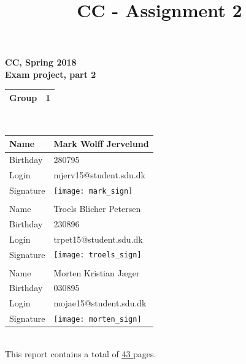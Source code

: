 \documentclass[a4paper,10pt,titlepage]{report}
\date{}
\title{CC - Assignment 2}
\begin{document}
\newpage
{%
\centering
    \huge
    \bfseries
    \vspace{5mm}
CC, Spring 2018\\
Exam project, part 2\\
\vspace{5mm}
\begin{tabular}{|l|l|}
\hline
Group & 1 \\ \hline
\end{tabular}
\\
\vspace{10mm}
\begin{tabular}{@{}ll@{}}
\toprule
\multicolumn{1}{|l|}{Name}      & \multicolumn{1}{l|}{Mark Wolff Jervelund } \\ \midrule
\multicolumn{1}{|l|}{Birthday}  & \multicolumn{1}{l|}{280795} \\ \midrule
\multicolumn{1}{|l|}{Login}     & \multicolumn{1}{l|}{mjerv15@student.sdu.dk} \\ \midrule
\multicolumn{1}{|l|}{Signature} & \multicolumn{1}{l|}{\texttt{[image: mark\_sign]}} \\ \midrule
                                &                       \\ \midrule
\multicolumn{1}{|l|}{Name}      &  \multicolumn{1}{l|}{Troels Blicher Petersen} \\ \midrule
\multicolumn{1}{|l|}{Birthday}      &   \multicolumn{1}{l|}{230896} \\ \midrule
\multicolumn{1}{|l|}{Login}      &  \multicolumn{1}{l|}{trpet15@student.sdu.dk} \\ \midrule
\multicolumn{1}{|l|}{Signature}      & \multicolumn{1}{l|}{\texttt{[image: troels\_sign]} } \\ \midrule
                                &                       \\ \midrule
\multicolumn{1}{|l|}{Name}     &  \multicolumn{1}{l|}{Morten Kristian Jæger} \\ \midrule
\multicolumn{1}{|l|}{Birthday}      &  \multicolumn{1}{l|}{030895} \\ \midrule
\multicolumn{1}{|l|}{Login}     &   \multicolumn{1}{l|}{mojae15@student.sdu.dk} \\ \midrule
\multicolumn{1}{|l|}{Signature}    &  \multicolumn{1}{l|}{\texttt{[image: morten\_sign]}} \\ \midrule
\end{tabular}
\\
\vspace{10mm}
This report contains a total of \underline{ 43 } pages.
}
\end{document}
